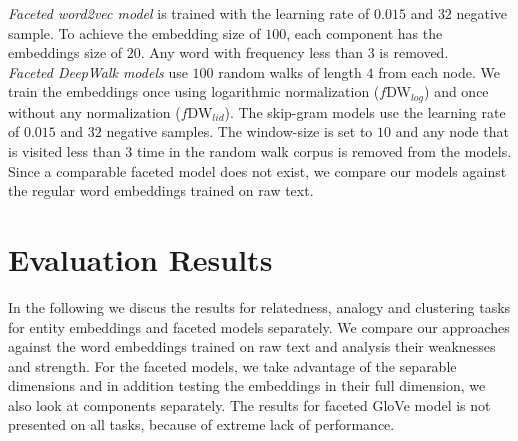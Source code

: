 \noindent
\emph{Faceted word2vec model} is trained with the learning rate of $0.015$ and $32$ negative sample. To achieve the embedding size of $100$, each component has the embeddings size of $20$. Any word with frequency less than $3$ is removed. \\

\noindent
\emph{Faceted DeepWalk models} use $100$ random walks of length $4$ from each node. We train the embeddings once using logarithmic normalization ($f$DW$_{log}$) and once without any normalization ($f$DW$_{lid}$). The skip-gram models use the learning rate of $0.015$ and $32$ negative samples. The window-size is set to $10$ and any node that is visited less than $3$ time in the random walk corpus is removed from the models. 
\\

Since a comparable faceted model does not exist, we compare our models against the regular word embeddings trained on raw text. 
\section{Evaluation Results}\label{sec:eval_results}
In the following we discus the results for relatedness, analogy and clustering tasks for entity embeddings and faceted models separately. We compare our approaches against the word embeddings trained on raw text and analysis their weaknesses and strength. For the faceted models, we take advantage of the separable dimensions and in addition testing the embeddings in their full dimension, we also look at components separately. The results for faceted GloVe model is not presented on all tasks, because of extreme lack of performance. 
